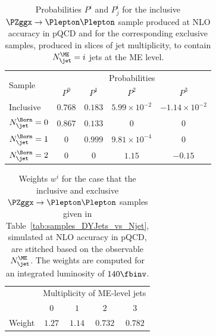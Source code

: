 \begin{table}[h!]
\begin{center}
\def\arraystretch{1.3}
\begin{tabular}{l|cccc}
\hline
\multirow{2}{*}{Sample}    & \multicolumn{4}{c}{Probabilities} \\
                           & $P^{0}$ & $P^{1}$ & $P^{2}$ & $P^{3}$ \\
\hline
\hline
Inclusive                  & $0.768$              & $0.183$ & $5.99\times10^{-2}$ & $-1.14\times10^{-2}$ \\
\hline
$N_{\jet}^{\Born} = 0$     & $0.867$              & $0.133$ & $0$                 & $0$     \\
$N_{\jet}^{\Born} = 1$     & $0$                  & $0.999$ & $9.81\times10^{-4}$ & $0$     \\
$N_{\jet}^{\Born} = 2$     & $0$                  & $0$     & $1.15$              & $-0.15$ \\
\hline
\end{tabular}
\end{center}
\caption{
  Probabilities $P^{i}$ and $P_{j}^{i}$ for the inclusive $\PZggx \to \Plepton\Plepton$ sample produced at NLO accuracy in pQCD 
  and for the corresponding exclusive samples, produced in slices of jet multiplicity,
  to contain $N_{\jet}^{\ME} = i$ jets at the ME level.
}
\label{tab:probabilities_exclusive_DYJets_vs_Njet}
\end{table}

\begin{table}[h!]
\centering
\def\arraystretch{1.3}
\begin{tabular}{l|cccc}
\hline
 & \multicolumn{4}{c}{Multiplicity of ME-level jets} \\
 & $0$ & $1$ & $2$ & $3$ \\
\hline
\hline
Weight & $1.27$               & $1.14$  & $0.732$ & $0.782$ \\
\hline
\end{tabular}
\caption{
  Weights $w^{i}$ for the case that the inclusive and exclusive $\PZggx \to \Plepton\Plepton$ samples 
  given in Table~\ref{tab:samples_DYJets_vs_Njet}, simulated at NLO accuracy in pQCD,
  are stitched based on the observable $N_{\jet}^{\ME}$.
  The weights are computed for an integrated luminosity of $140\fbinv$.
}
\label{tab:weights_DYJets_vs_Njet}
\end{table}

